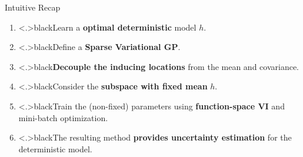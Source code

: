 \documentclass[aspectratio=149]{beamer}
\begin{document}
    \begin{frame}{Intuitive Recap}
        \begin{enumerate}[<+->]\color{shadecolor}
            \item \color<.>{black}Learn a \textbf{optimal deterministic} model \(h\).
            \item \color<.>{black}Define a \textbf{Sparse Variational GP}.
            \item \color<.>{black}\textbf{Decouple the inducing locations} from the mean and covariance.
            \item \color<.>{black}Consider the \textbf{subspace with fixed mean} \(h\).
            \item \color<.>{black}Train the (non-fixed) parameters using \textbf{function-space VI} and mini-batch optimization.
            \item \color<.>{black}The resulting method \textbf{provides uncertainty estimation} for the deterministic model.
        \end{enumerate}
    \end{frame}

    
\end{document}
